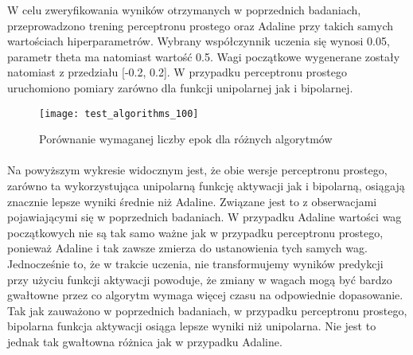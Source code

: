 \documentclass[\main/main.tex]{subfiles}
\begin{document}
    \justify
    W celu zweryfikowania wyników otrzymanych w poprzednich badaniach, przeprowadzono trening perceptronu prostego oraz Adaline przy takich samych wartościach hiperparametrów. Wybrany współczynnik uczenia się wynosi 0.05, parametr theta ma natomiast wartość 0.5. Wagi początkowe wygenerane zostały natomiast z przedziału [-0.2, 0.2]. W przypadku perceptronu prostego uruchomiono pomiary zarówno dla funkcji unipolarnej jak i bipolarnej.
    
    \begin{figure}[H]
    \centering
    \texttt{[image: test\_algorithms\_100]}
    \caption{Porównanie wymaganej liczby epok dla różnych algorytmów}
    \end{figure}
    
    \paragraph{}
    Na powyższym wykresie widocznym jest, że obie wersje perceptronu prostego, zarówno ta wykorzystująca unipolarną funkcję aktywacji jak i bipolarną, osiągają znacznie lepsze wyniki średnie niż Adaline. Związane jest to z obserwacjami pojawiającymi się w poprzednich badaniach. W przypadku Adaline wartości wag początkowych nie są tak samo ważne jak w przypadku perceptronu prostego, ponieważ Adaline i tak zawsze zmierza do ustanowienia tych samych wag. Jednocześnie to, że w trakcie uczenia, nie transformujemy wyników predykcji przy użyciu funkcji aktywacji powoduje, że zmiany w wagach mogą być bardzo gwałtowne przez co algorytm wymaga więcej czasu na odpowiednie dopasowanie. Tak jak zauważono w poprzednich badaniach, w przypadku perceptronu prostego, bipolarna funkcja aktywacji osiąga lepsze wyniki niż unipolarna. Nie jest to jednak tak gwałtowna różnica jak w przypadku Adaline.
    
\end{document}
